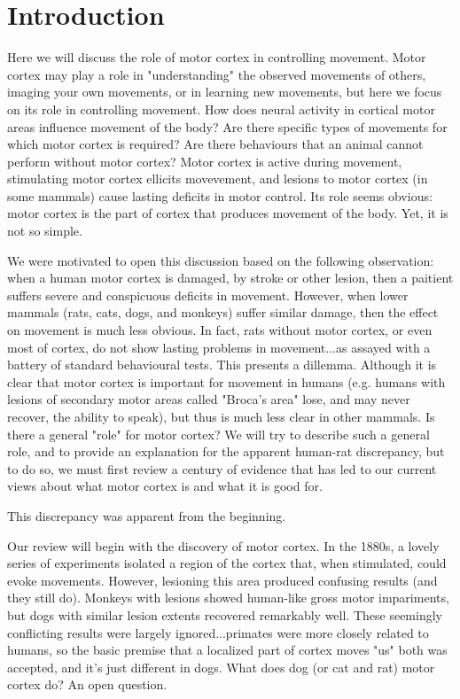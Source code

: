 \section{Introduction}

Here we will discuss the role of motor cortex in controlling movement.  Motor cortex may play a role in "understanding" the observed movements of others, imaging your own movements, or in learning new movements, but here we focus on its role in controlling movement. How does neural activity in cortical motor areas influence movement of the body? Are there specific types of movements for which motor cortex is required? Are there behaviours that an animal cannot perform without motor cortex? Motor cortex is active during movement, stimulating motor cortex ellicits movevement, and lesions to motor cortex (in some mammals) cause lasting deficits in motor control. Its role seems obvious: motor cortex is the part of cortex that produces movement of the body. Yet, it is not so simple.

We were motivated to open this discussion based on the following observation: when a human motor cortex is damaged, by stroke or other lesion, then a paitient suffers severe and conspicuous deficits in movement. However, when lower mammals (rats, cats, dogs, and monkeys) suffer similar damage, then the effect on movement is much less obvious. In fact, rats without motor cortex, or even most of cortex, do not show lasting problems in movement...as assayed with a battery of standard behavioural tests. This presents a dillemma. Although it is clear that motor cortex is important for movement in humans (e.g. humans with lesions of secondary motor areas called "Broca's area" lose, and may never recover, the ability to speak), but thus is much less clear in other mammals. Is there a general "role" for motor cortex? We will try to describe such a general role, and to provide an explanation for the apparent human-rat discrepancy, but to do so, we must first review a century of evidence that has led to our current views about what motor cortex is and what it is good for. 

This discrepancy was apparent from the beginning. 

Our review will begin with the discovery of motor cortex. In the 1880s, a lovely series of experiments isolated a region of the cortex that, when stimulated, could evoke movements. However, lesioning this area produced confusing results (and they still do). Monkeys with lesions showed human-like gross motor impariments, but dogs with similar lesion extents recovered remarkably well. These seemingly conflicting results were largely ignored...primates were more closely related to humans, so the basic premise that a localized part of cortex moves "us" both was accepted, and it's just different in dogs. What does dog (or cat and rat) motor cortex do? An open question.

